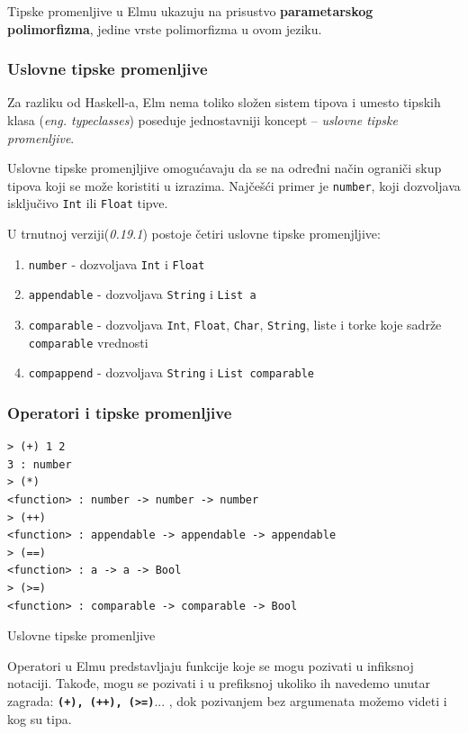 \documentclass[12pt,oneside]{memoir}
\begin{document}
Tipske promenljive u Elmu ukazuju na prisustvo \textbf{parametarskog polimorfizma},
jedine vrste polimorfizma u ovom jeziku.

\subsubsection{Uslovne tipske promenljive}
Za razliku od Haskell-a, Elm nema toliko složen sistem tipova i umesto tipskih klasa
(\emph{eng. typeclasses})\cite{typeclasses} poseduje jednostavniji koncept --
\emph{uslovne tipske promenljive}. 

Uslovne tipske promenjljive omogućavaju da se na određni način ograniči skup tipova
koji se može koristiti u izrazima. Najčešći primer je \texttt{number}, koji dozvoljava 
isključivo \texttt{Int} ili \texttt{Float} tipve. 

U trnutnoj verziji(\emph{0.19.1}) postoje četiri uslovne tipske promenjljive:
\begin{enumerate}
  \item \texttt{number} - dozvoljava \texttt{Int} i \texttt{Float}
  \item \texttt{appendable} - dozvoljava \texttt{String} i \texttt{List a}
  \item \texttt{comparable} - dozvoljava \texttt{Int}, \texttt{Float}, \texttt{Char},
  \texttt{String}, liste i torke koje sadrže \texttt{comparable} vrednosti
  \item \texttt{compappend} - dozvoljava \texttt{String} i \texttt{List comparable}
\end{enumerate}

\subsubsection{Operatori i tipske promenljive}
\begin{listing}[h]
\begin{verbatim}
> (+) 1 2
3 : number
> (*)
<function> : number -> number -> number
> (++)
<function> : appendable -> appendable -> appendable
> (==)
<function> : a -> a -> Bool
> (>=)
<function> : comparable -> comparable -> Bool
\end{verbatim}
\caption{Uslovne tipske promenljive}
\label{listing:tipskePromenljive}
\end{listing}
Operatori u Elmu predstavljaju funkcije koje se mogu pozivati u infiksnoj notaciji. Takođe, 
mogu se pozivati i u prefiksnoj ukoliko ih navedemo unutar zagrada: \texttt{\textbf{(+),
(++), (>=)}}... , dok pozivanjem bez argumenata možemo videti i kog su tipa.
\end{document}
